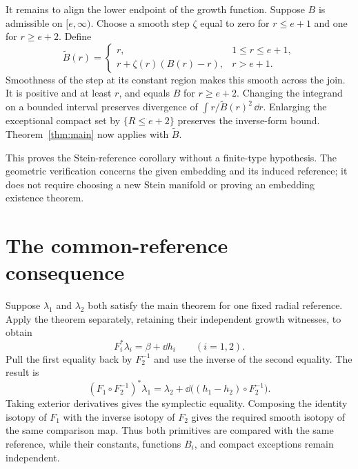 It remains to align the lower endpoint of the growth function.
Suppose $B$ is admissible on $[e,\infty)$.
Choose a smooth step $\zeta$ equal to zero for $r\le e+1$
and one for $r\ge e+2$.
Define
\[
 \widetilde B(r)=
 \begin{cases}
 r,&1\le r\le e+1,\\
 r+\zeta(r)(B(r)-r),&r>e+1.
 \end{cases}
\]
Smoothness of the step at its constant region makes this smooth
across the join. It is positive and at least $r$, and equals
$B$ for $r\ge e+2$.
Changing the integrand on a bounded interval preserves divergence
of $\int r/\widetilde B(r)^2\,\dd r$.
Enlarging the exceptional compact set by $\{R\le e+2\}$
preserves the inverse-form bound.
Theorem~\ref{thm:main} now applies with $\widetilde B$.

This proves the Stein-reference corollary without a finite-type
hypothesis. The geometric verification concerns the given
embedding and its induced reference; it does not require choosing
a new Stein manifold or proving an embedding existence theorem.

\section{The common-reference consequence}
Suppose $\lambda_1$ and $\lambda_2$ both satisfy the main theorem
for one fixed radial reference. Apply the theorem separately,
retaining their independent growth witnesses, to obtain
\[
 F_i^*\lambda_i=\beta+\dd h_i\qquad(i=1,2).
\]
Pull the first equality back by $F_2^{-1}$ and use the inverse
of the second equality. The result is
\[
 (F_1\circ F_2^{-1})^*\lambda_1
 =\lambda_2+
   \dd\bigl((h_1-h_2)\circ F_2^{-1}\bigr).
\]
Taking exterior derivatives gives the symplectic equality.
Composing the identity isotopy of $F_1$ with the inverse isotopy
of $F_2$ gives the required smooth isotopy of the same comparison
map. Thus both primitives are compared with the same reference,
while their constants, functions $B_i$, and compact exceptions
remain independent.

